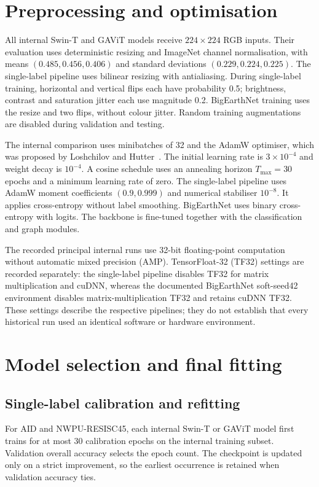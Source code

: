 \section{Preprocessing and optimisation}

All internal Swin-T and GAViT models receive $224\times224$ RGB inputs.
Their evaluation uses deterministic
resizing and ImageNet channel normalisation, with means
$(0.485,0.456,0.406)$ and standard deviations $(0.229,0.224,0.225)$.
The single-label pipeline uses bilinear resizing with antialiasing. During
single-label training, horizontal and vertical flips each have probability
0.5; brightness, contrast and saturation jitter each use magnitude 0.2.
BigEarthNet training uses the resize and two flips, without colour jitter.
Random training augmentations are disabled during validation and testing.

The internal comparison uses minibatches of 32 and the AdamW optimiser,
which was proposed by Loshchilov and Hutter~\cite{loshchilov2019adamw}.
The initial learning rate is $3\times10^{-4}$ and weight decay is
$10^{-4}$. A cosine schedule uses an annealing horizon $T_{\max}=30$ epochs and a
minimum learning rate of zero. The single-label pipeline uses AdamW moment
coefficients $(0.9,0.999)$ and numerical stabiliser $10^{-8}$. It applies
cross-entropy without label smoothing. BigEarthNet uses binary
cross-entropy with logits. The backbone is fine-tuned together with the
classification and graph modules.

The recorded principal internal runs use 32-bit floating-point computation without
automatic mixed precision (AMP). TensorFloat-32 (TF32) settings are recorded
separately: the single-label pipeline disables TF32 for matrix multiplication
and cuDNN, whereas the documented BigEarthNet soft-seed42 environment disables
matrix-multiplication TF32 and retains cuDNN TF32. These settings describe the
respective pipelines; they do not establish that every historical run used
an identical software or hardware environment.

\section{Model selection and final fitting}

\subsection{Single-label calibration and refitting}

For AID and NWPU-RESISC45, each internal Swin-T or GAViT model first trains for at most 30 calibration
epochs on the internal training subset. Validation overall accuracy selects
the epoch count. The checkpoint is updated only on a strict improvement,
so the earliest occurrence is retained when validation accuracy ties.

